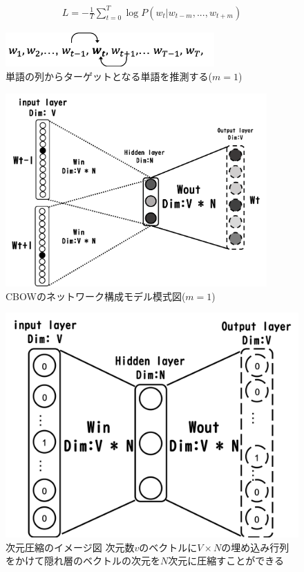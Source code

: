 \documentclass[a4j,11pt,report]{jsbook}
\begin{document}
\begin{equation}
  \label{cbow_loss}
  \begin{array}{c}
    L = -\frac{1}{T} \sum_{t = 0}^T \log P(w_{t}|w_{t-m},...,w_{t+m})
  \end{array}
\end{equation}

\begin{figure}
  \centering
  \includegraphics[width = 80mm]{image/cbow_w1w2wt-1wtwt+1.png}
  \caption{単語の列からターゲットとなる単語を推測する($m = 1$)}
  \label{fig:CBOWformula}
\end{figure}

\begin{figure}
  \centering
  \includegraphics[width = 100mm]{image/CBOW_windowsize_1.png}
  \caption{CBOWのネットワーク構成モデル模式図($ m = 1$) }
  \label{fig:CBOWimage}
\end{figure}



\begin{figure}
  \centering
  \includegraphics[scale = 0.5]{image/CBOW_image.png}
  \caption{次元圧縮のイメージ図 次元数$v$のベクトルに$V \times N $の埋め込み行列をかけて隠れ層のベクトルの次元を$N$次元に圧縮すことができる}
  \label{fig:CBOWimage}
\end{figure}
\fi
\end{document}

